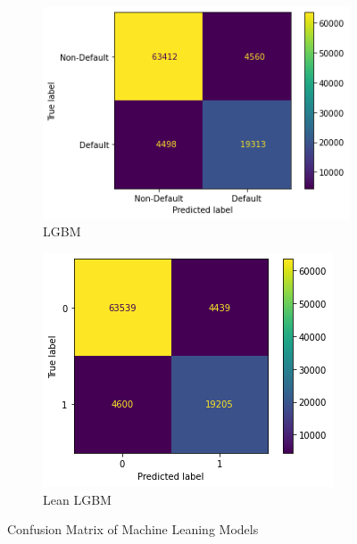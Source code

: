 \documentclass[twoside,11pt,a4paper]{article}
\begin{document}
\begin{figure}[h!]
\begin{subfigure}{0.4 \textwidth}
		\includegraphics[width=1\linewidth, height=0.8\linewidth]{cm_lgbm}
		\caption[Light Gradient Boosting Machine]{\acs{LGBM}}
		\label{fig:cm_lgbm}
	\end{subfigure}
	\hfill
		\begin{subfigure}{0.4 \textwidth}
		\includegraphics[width=1\linewidth, height=0.8\linewidth]{cm_lean_lgbm}
		\caption[Lean Light Gradient Boosting Machine]{Lean LGBM}
		\label{fig:cm_lean_lgbm}
	\end{subfigure}
	\caption[Confusion Matrix of Machine Leaning Models]{Confusion Matrix of Machine Leaning Models}
	\label{fig:cm_ml}
\end{figure}
\end{document}
